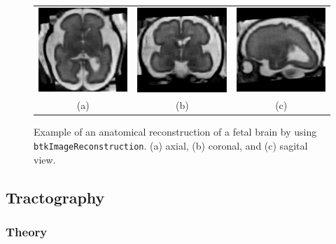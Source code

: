 \begin{figure}[t]
\centering
\begin{tabular}{ccc}
\includegraphics[width=0.3\columnwidth]{hr_axl.eps}&
\includegraphics[width=0.3\columnwidth]{hr_cor.eps}&
\includegraphics[width=0.3\columnwidth]{hr_sag.eps}\\
{(a)}&{(b)}&{(c)}\\
\end{tabular}
\caption{Example of an anatomical reconstruction of a fetal brain by using
\texttt{btkImageReconstruction}. (a) axial, (b) coronal, and (c) sagital view.}
\label{fig:reconstruction}
\end{figure}


\subsection{Tractography}
    \subsubsection*{Theory}

